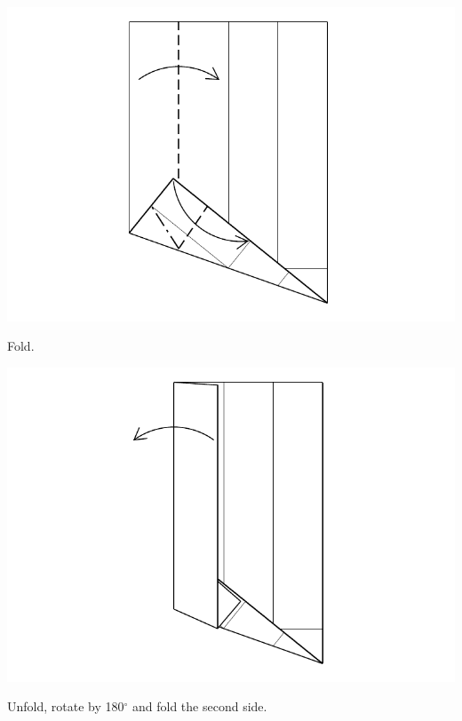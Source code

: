 \documentclass[11pt]{article}
\begin{document}
\vspace*{0.5in}

\begin{minipage}[t]{0.45\textwidth}
  \includegraphics[width=\textwidth]{../figs/fig10-06}
  \begin{itemize}{\item[6.] Fold.}\end{itemize}
\end{minipage}
\hfill
\begin{minipage}[t]{0.45\textwidth}
  \includegraphics[width=\textwidth]{../figs/fig10-07}
  \begin{itemize}{\item[7.] Unfold, rotate by 180$^\circ$ and fold the second side.}\end{itemize}
\end{minipage}
\end{document}
